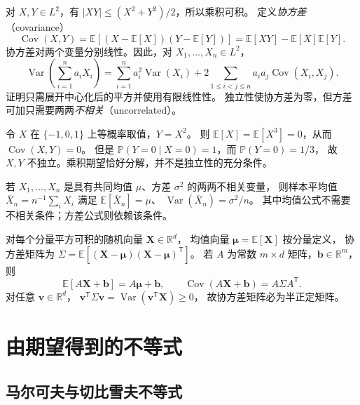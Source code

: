 \documentclass[UTF8,12pt,a4paper,fontset=fandol]{ctexart}
\begin{document}
对 $X,Y\in L^2$，有 $|XY|\leq(X^2+Y^2)/2$，所以乘积可积。
定义\emph{协方差}（covariance）
\[
  \operatorname{Cov}(X,Y)
  =\mathbb E[(X-\mathbb E[X])(Y-\mathbb E[Y])]
  =\mathbb E[XY]-\mathbb E[X]\mathbb E[Y].
\]
协方差对两个变量分别线性。因此，对 $X_1,\ldots,X_n\in L^2$，
\begin{equation}
  \operatorname{Var}\!\left(\sum_{i=1}^n a_iX_i\right)
  =\sum_{i=1}^n a_i^2\operatorname{Var}(X_i)
   +2\sum_{1\leq i<j\leq n}a_ia_j\operatorname{Cov}(X_i,X_j).
  \label{eq:expectation-variance-sum}
\end{equation}
证明只需展开中心化后的平方并使用有限线性性。
独立性使协方差为零，但方差可加只需要两两\emph{不相关}（uncorrelated）。

\begin{example}[不相关不等于独立]
\label{ex:expectation-dependent-uncorrelated}
令 $X$ 在 $\{-1,0,1\}$ 上等概率取值，$Y=X^2$。
则 $\mathbb E[X]=\mathbb E[X^3]=0$，从而 $\operatorname{Cov}(X,Y)=0$。
但是 $\mathbb P(Y=0\mid X=0)=1$，而 $\mathbb P(Y=0)=1/3$，
故 $X,Y$ 不独立。乘积期望恰好分解，并不是独立性的充分条件。
\end{example}

若 $X_1,\ldots,X_n$ 是具有共同均值 $\mu$、方差 $\sigma^2$ 的两两不相关变量，
则样本平均值 $\overline X_n=n^{-1}\sum_iX_i$ 满足
$\mathbb E[\overline X_n]=\mu$、
$\operatorname{Var}(\overline X_n)=\sigma^2/n$。
其中均值公式不需要不相关条件；方差公式则依赖该条件。

对每个分量平方可积的随机向量 $\mathbf X\in\mathbb R^d$，
均值向量 $\boldsymbol\mu=\mathbb E[\mathbf X]$ 按分量定义，
协方差矩阵为 $\Sigma=\mathbb E[(\mathbf X-\boldsymbol\mu)(\mathbf X-\boldsymbol\mu)^{\mathsf T}]$。
若 $A$ 为常数 $m\times d$ 矩阵，$\mathbf b\in\mathbb R^m$，则
\[
  \mathbb E[A\mathbf X+\mathbf b]=A\boldsymbol\mu+\mathbf b,
  \qquad
  \operatorname{Cov}(A\mathbf X+\mathbf b)=A\Sigma A^{\mathsf T}.
\]
对任意 $\mathbf v\in\mathbb R^d$，
$\mathbf v^{\mathsf T}\Sigma\mathbf v=\operatorname{Var}(\mathbf v^{\mathsf T}\mathbf X)\geq0$，
故协方差矩阵必为半正定矩阵。

\section{由期望得到的不等式}
\label{sec:expectation-inequalities}

\subsection{马尔可夫与切比雪夫不等式}
\end{document}
